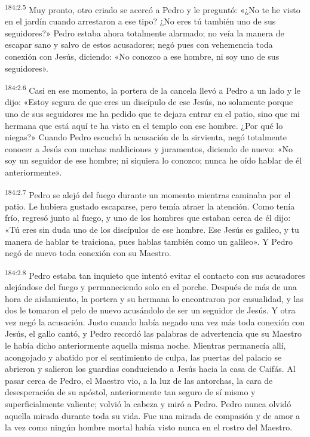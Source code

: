 \par 
\textsuperscript{184:2.5} Muy pronto, otro criado se acercó a Pedro y le preguntó: «¿No te he visto en el jardín cuando arrestaron a ese tipo? ¿No eres tú también uno de sus seguidores?» Pedro estaba ahora totalmente alarmado; no veía la manera de escapar sano y salvo de estos acusadores; negó pues con vehemencia toda conexión con Jesús, diciendo: «No conozco a ese hombre, ni soy uno de sus seguidores».

\par 
\textsuperscript{184:2.6} Casi en ese momento, la portera de la cancela llevó a Pedro a un lado y le dijo: «Estoy segura de que eres un discípulo de ese Jesús, no solamente porque uno de sus seguidores me ha pedido que te dejara entrar en el patio, sino que mi hermana que está aquí te ha visto en el templo con ese hombre. ¿Por qué lo niegas?» Cuando Pedro escuchó la acusación de la sirvienta, negó totalmente conocer a Jesús con muchas maldiciones y juramentos, diciendo de nuevo: «No soy un seguidor de ese hombre; ni siquiera lo conozco; nunca he oído hablar de él anteriormente».

\par 
\textsuperscript{184:2.7} Pedro se alejó del fuego durante un momento mientras caminaba por el patio. Le hubiera gustado escaparse, pero temía atraer la atención. Como tenía frío, regresó junto al fuego, y uno de los hombres que estaban cerca de él dijo: «Tú eres sin duda uno de los discípulos de ese hombre. Ese Jesús es galileo, y tu manera de hablar te traiciona, pues hablas también como un galileo». Y Pedro negó de nuevo toda conexión con su Maestro.

\par 
\textsuperscript{184:2.8} Pedro estaba tan inquieto que intentó evitar el contacto con sus acusadores alejándose del fuego y permaneciendo solo en el porche. Después de más de una hora de aislamiento, la portera y su hermana lo encontraron por casualidad, y las dos le tomaron el pelo de nuevo acusándolo de ser un seguidor de Jesús. Y otra vez negó la acusación. Justo cuando había negado una vez más toda conexión con Jesús, el gallo cantó, y Pedro recordó las palabras de advertencia que su Maestro le había dicho anteriormente aquella misma noche. Mientras permanecía allí, acongojado y abatido por el sentimiento de culpa, las puertas del palacio se abrieron y salieron los guardias conduciendo a Jesús hacia la casa de Caifás. Al pasar cerca de Pedro, el Maestro vio, a la luz de las antorchas, la cara de desesperación de su apóstol, anteriormente tan seguro de sí mismo y superficialmente valiente; volvió la cabeza y miró a Pedro. Pedro nunca olvidó aquella mirada durante toda su vida. Fue una mirada de compasión y de amor a la vez como ningún hombre mortal había visto nunca en el rostro del Maestro.


